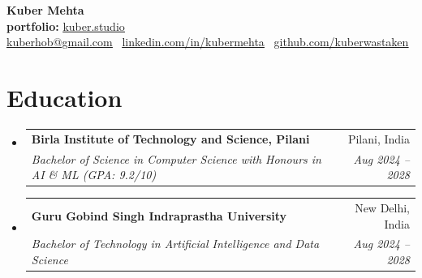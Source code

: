 \documentclass[letterpaper,11pt]{article}
\makeatletter
\let\oldhref\href
\renewcommand{\href}[2]{\oldhref{#1}{\textcolor{linknavy}{\uline{#2}}}}
\newcommand{\resumeSubheading}[4]{
  \vspace{-1pt}\item
    \begin{tabular*}{0.97\textwidth}{l@{\extracolsep{\fill}}r}
      \textbf{#1} & #2 \\
      \textit{\small #3} & \textit{\small #4} \\
    \end{tabular*}\vspace{-5pt}  %
}
\newcommand{\resumeSubHeadingListStart}{\begin{itemize}[leftmargin=*, itemsep=3pt, parsep=0pt, topsep=3.5pt]}
\newcommand{\resumeSubHeadingListEnd}{\end{itemize}}
\makeatother
\begin{document}
\begin{center}
  {\LARGE \textbf{Kuber Mehta}} \\[2pt]
  \textbf{portfolio:} \href{https://kuber.studio}{kuber.studio} \\[2pt]
  \small \href{mailto:kuberhob@gmail.com}{kuberhob@gmail.com} \textbar\ \href{https://linkedin.com/in/kubermehta}{linkedin.com/in/kubermehta} \textbar\ \href{https://github.com/kuberwastaken}{github.com/kuberwastaken}
\end{center}
\vspace{1pt}

\section*{Education}
\resumeSubHeadingListStart
  \resumeSubheading
    {Birla Institute of Technology and Science, Pilani}{Pilani, India}
    {Bachelor of Science in Computer Science with Honours in AI \& ML \hfill (GPA: 9.2/10)}{Aug 2024 -- 2028}
  \resumeSubheading
    {Guru Gobind Singh Indraprastha University}{New Delhi, India}
    {Bachelor of Technology in Artificial Intelligence and Data Science}{Aug 2024 -- 2028}
\resumeSubHeadingListEnd
\end{document}
